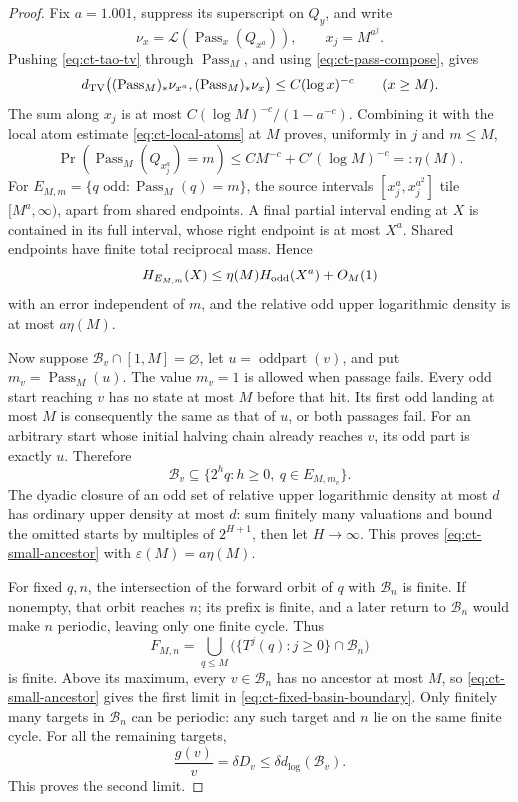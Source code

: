 \begin{proof}
Fix \(a=1.001\), suppress its superscript on \(Q_y\), and write
\[
 \nu_x=\mathcal L(\operatorname{Pass}_x(Q_{x^a})),\qquad
 x_j=M^{a^j}.
\]
Pushing \eqref{eq:ct-tao-tv} through \(\operatorname{Pass}_M\),
and using \eqref{eq:ct-pass-compose}, gives
\[
 d_{\rm TV}\bigl((\operatorname{Pass}_M)_*\nu_{x^{a}},
                 (\operatorname{Pass}_M)_*\nu_x\bigr)
             \le C(\log x)^{-c}\qquad(x\ge M).
\]
The sum along \(x_j\) is at most
\(C(\log M)^{-c}/(1-a^{-c})\). Combining it with the local
atom estimate \eqref{eq:ct-local-atoms} at \(M\) proves, uniformly
in \(j\) and \(m\le M\),
\[
 \Pr(\operatorname{Pass}_M(Q_{x_j^a})=m)
       \le C M^{-c}+C'(\log M)^{-c}=:\eta(M).
\]
For
\(E_{M,m}=\{q\text{ odd}:\operatorname{Pass}_M(q)=m\}\),
the source intervals \([x_j^a,x_j^{a^2}]\) tile
\([M^a,\infty)\), apart from shared endpoints.
A final partial interval ending at \(X\) is contained in its full
interval, whose right endpoint is at most \(X^a\).
Shared endpoints have finite total reciprocal mass. Hence
\[
 H_{E_{M,m}}(X)\le\eta(M)H_{\rm odd}(X^a)+O_M(1)
\]
with an error independent of \(m\), and the relative odd upper
logarithmic density is at most \(a\eta(M)\).

Now suppose \(\mathcal B_v\cap[1,M]=\varnothing\), let
\(u=\operatorname{oddpart}(v)\), and put
\(m_v=\operatorname{Pass}_M(u)\). The value \(m_v=1\) is allowed
when passage fails. Every odd start reaching \(v\) has no state
at most \(M\) before that hit. Its first odd landing at most \(M\)
is consequently the same as that of \(u\), or both passages fail.
For an arbitrary start whose initial halving chain already reaches
\(v\), its odd part is exactly \(u\). Therefore
\[
 \mathcal B_v\subseteq\{2^hq:h\ge0,\ q\in E_{M,m_v}\}.
\]
The dyadic closure of an odd set of relative upper logarithmic
density at most \(d\) has ordinary upper density at most \(d\):
sum finitely many valuations and bound the omitted starts by
multiples of \(2^{H+1}\), then let \(H\to\infty\).
This proves \eqref{eq:ct-small-ancestor} with
\(\varepsilon(M)=a\eta(M)\).

For fixed \(q,n\), the intersection of the forward orbit of \(q\)
with \(\mathcal B_n\) is finite. If nonempty, that orbit reaches
\(n\); its prefix is finite, and a later return to \(\mathcal B_n\)
would make \(n\) periodic, leaving only one finite cycle.
Thus
\[
 F_{M,n}=\bigcup_{q\le M}
       \bigl(\{T^j(q):j\ge0\}\cap\mathcal B_n\bigr)
\]
is finite. Above its maximum, every \(v\in\mathcal B_n\) has
no ancestor at most \(M\), so
\eqref{eq:ct-small-ancestor} gives the first limit in
\eqref{eq:ct-fixed-basin-boundary}.
Only finitely many targets in \(\mathcal B_n\) can be periodic:
any such target and \(n\) lie on the same finite cycle.
For all the remaining targets,
\[
 \frac{g(v)}v=\delta D_v\le\delta d_{\log}(\mathcal B_v).
\]
This proves the second limit.
\end{proof}


